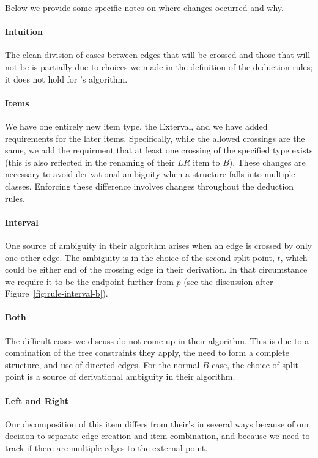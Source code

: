 Below we provide some specific notes on where changes occurred and why.

\paragraph{Intuition}
The clean division of cases between edges that will be crossed and those that will not be is partially due to choices we made in the definition of the deduction rules; it does not hold for \textcite{ec}'s algorithm.

\paragraph{Items}
We have one entirely new item type, the Exterval, and we have added requirements for the later items.
Specifically, while the allowed crossings are the same, we add the requirment that at least one crossing of the specified type exists (this is also reflected in the renaming of their $LR$ item to $B$).
These changes are necessary to avoid derivational ambiguity when a structure falls into multiple classes.
Enforcing these difference involves changes throughout the deduction rules.

\paragraph{Interval}
One source of ambiguity in their algorithm arises when an edge is crossed by only one other edge.
The ambiguity is in the choice of the second split point, $t$, which could be either end of the crossing edge in their derivation.
In that circumstance we require it to be the endpoint further from $p$ (see the discussion after Figure~\ref{fig:rule-interval-b}).

\paragraph{Both}
The difficult cases we discuss do not come up in their algorithm.
This is due to a combination of the tree constraints they apply, the need to form a complete structure, and use of directed edges.
For the normal $B$ case, the choice of split point is a source of derivational ambiguity in their algorithm.

\paragraph{Left and Right}
Our decomposition of this item differs from their's in several ways because of our decision to separate edge creation and item combination, and because we need to track if there are multiple edges to the external point.

